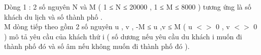 Dòng 1 : 2 số nguyên N và M ( 1 ≤ N ≤ 20000 , 1 ≤ M ≤ 8000 ) tương ứng là số khách du lịch và số thành phố .   
\\   M dòng tiếp theo gồm 2 số nguyên u , v , -M ≤ u ,v ≤ M ( u $<$$>$ 0 , v $<$$>$ 0 ) mô tả yêu cầu của khách thứ i ( số dương nếu yêu cầu du khách i muốn đi thành phố đó và số âm nếu không muốn đi thành phố đó ).   
\\

\